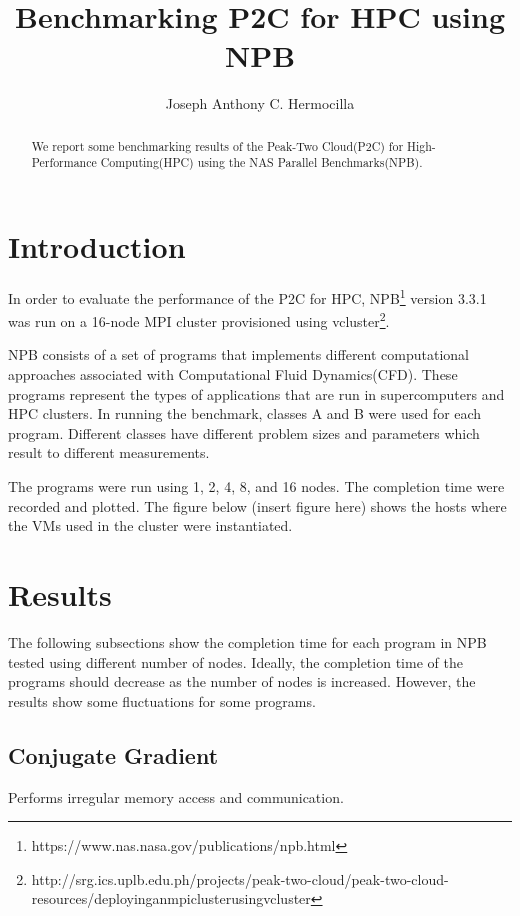 \documentclass[a4paper]{article}
\title{Benchmarking P2C for HPC using NPB}
\author{Joseph Anthony C. Hermocilla}
\begin{document}
\maketitle

\begin{abstract}
We report some benchmarking results of the Peak-Two Cloud(P2C) for High-Performance Computing(HPC) using the NAS Parallel Benchmarks(NPB).
\end{abstract}

\section{Introduction}

In order to evaluate the performance of the P2C\cite{hermocilla-p2c-ncite2014} for HPC, NPB\footnote{https://www.nas.nasa.gov/publications/npb.html} version 3.3.1 was run on a 16-node MPI cluster provisioned using vcluster\footnote{http://srg.ics.uplb.edu.ph/projects/peak-two-cloud/peak-two-cloud-resources/deployinganmpiclusterusingvcluster}.

NPB consists of a set of programs that implements different computational approaches associated with Computational Fluid Dynamics(CFD). These programs represent the types of applications that are run in supercomputers and HPC clusters. In running the benchmark, classes A and B were used for each program. Different classes have different problem sizes and parameters which result to different measurements.

The programs were run using 1, 2, 4, 8, and 16 nodes. The completion time were recorded and plotted. 
The figure below (insert figure here) shows the hosts where the VMs used in the cluster were instantiated. 


\section{Results}

The following subsections show the completion time for each program in NPB tested using different number of nodes. Ideally, the completion time of the programs should decrease as the number of nodes is increased. However, the results show some fluctuations for some programs. 

\subsection{Conjugate Gradient}

Performs irregular memory access and communication.
\end{document}
